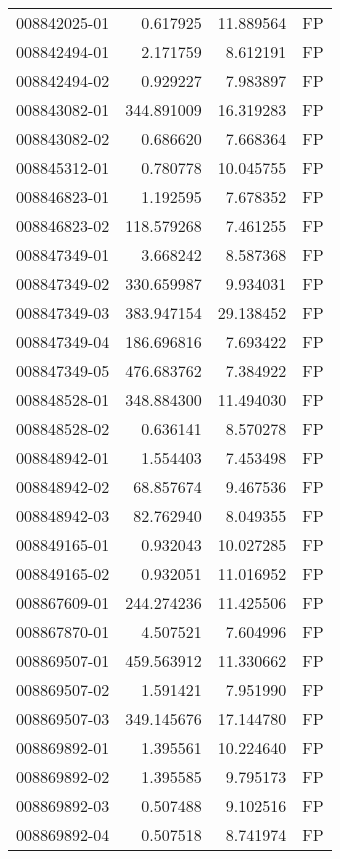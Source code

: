 \begin{tabular}{lrrl}
008842025-01 &    0.617925 &    11.889564 &   FP \\
008842494-01 &    2.171759 &     8.612191 &   FP \\
008842494-02 &    0.929227 &     7.983897 &   FP \\
008843082-01 &  344.891009 &    16.319283 &   FP \\
008843082-02 &    0.686620 &     7.668364 &   FP \\
008845312-01 &    0.780778 &    10.045755 &   FP \\
008846823-01 &    1.192595 &     7.678352 &   FP \\
008846823-02 &  118.579268 &     7.461255 &   FP \\
008847349-01 &    3.668242 &     8.587368 &   FP \\
008847349-02 &  330.659987 &     9.934031 &   FP \\
008847349-03 &  383.947154 &    29.138452 &   FP \\
008847349-04 &  186.696816 &     7.693422 &   FP \\
008847349-05 &  476.683762 &     7.384922 &   FP \\
008848528-01 &  348.884300 &    11.494030 &   FP \\
008848528-02 &    0.636141 &     8.570278 &   FP \\
008848942-01 &    1.554403 &     7.453498 &   FP \\
008848942-02 &   68.857674 &     9.467536 &   FP \\
008848942-03 &   82.762940 &     8.049355 &   FP \\
008849165-01 &    0.932043 &    10.027285 &   FP \\
008849165-02 &    0.932051 &    11.016952 &   FP \\
008867609-01 &  244.274236 &    11.425506 &   FP \\
008867870-01 &    4.507521 &     7.604996 &   FP \\
008869507-01 &  459.563912 &    11.330662 &   FP \\
008869507-02 &    1.591421 &     7.951990 &   FP \\
008869507-03 &  349.145676 &    17.144780 &   FP \\
008869892-01 &    1.395561 &    10.224640 &   FP \\
008869892-02 &    1.395585 &     9.795173 &   FP \\
008869892-03 &    0.507488 &     9.102516 &   FP \\
008869892-04 &    0.507518 &     8.741974 &   FP \\

\end{tabular}
